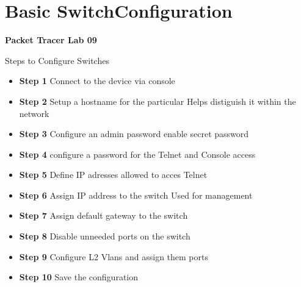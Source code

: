\documentclass[../EngineeringJournal_CDavis.tex]{subfiles}
\begin{document}

\chapter[Basic Switch Configuration]{Basic Switch\linebreak[1]
Configuration \hspace*{\fill February 21, 2020}}
\noindent\textbf{{Packet Tracer Lab 09} }                             


\hspace{0.2cm}
\begin{tcolorbox}[width=6.3in]
Steps to Configure Switches
\scriptsize 
\begin{itemize}
    \item{\bf{Step 1}} Connect to the device via console
    \item{\bf{Step 2}} Setup a hostname for the particular
        \subitem{} Helps distiguish it within the network
    \item{\bf{Step 3}} Configure an admin password
        \subitem{} enable secret password
    \item{\bf{Step 4}} configure a password for the Telnet and Console access 
    \item{\bf{Step 5}} Define IP adresses allowed to acces Telnet
    \item{\bf{Step 6}} Assign IP address to the switch
        \subitem{} Used for management
    \item{\bf{Step 7}} Assign default gateway to the switch
    \item{\bf{Step 8}} Disable unneeded ports on the switch
    \item{\bf{Step 9}} Configure L2 Vlans and assign them ports
    \item{\bf{Step 10}} Save the configuration 
\end{itemize}
\end{tcolorbox}
\hspace{0.2cm}
\normalsize  

\clearpage

\end{document}
